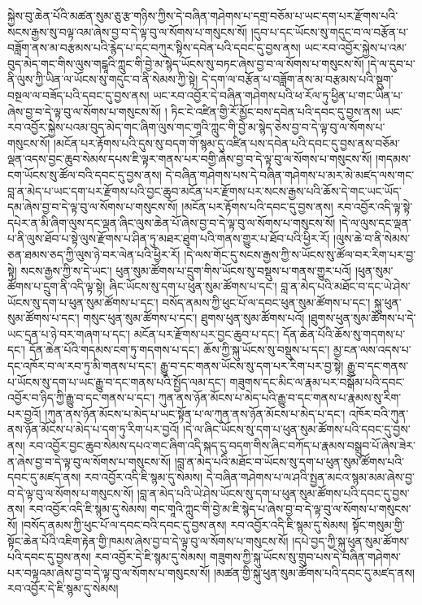 སྐྱེས་བུ་ཆེན་པོའི་མཚན་སུམ་ཅུ་རྩ་གཉིས་ཀྱིས་དེ་བཞིན་གཤེགས་པ་དགྲ་བཅོམ་པ་ཡང་དག་པར་རྫོགས་པའི་སངས་རྒྱས་སུ་བལྟ་འམ་ཞེས་བྱ་བ་དེ་ལྟ་བུ་ལ་སོགས་པ་གསུངས་སོ། །དུབ་པ་དང་ཡོངས་སུ་གདུང་བ་ལ་བརྩོན་པ་བཟློག་ནས་མ་བརྩམས་པའི་རྙེད་པ་དང་བཀུར་སྟིས་དབེན་པའི་དབང་དུ་བྱས་ནས། ཡང་རབ་འབྱོར་སྐྱེས་པ་འམ་བུད་མེད་གང་གིས་ལུས་གངྒཱའི་ཀླུང་གི་བྱེ་མ་སྙེད་ཡོངས་སུ་བཏང་ཞེས་བྱ་བ་ལ་སོགས་པ་གསུངས་སོ། །དེ་ལ་དུབ་པ་ནི་ལུས་ཀྱི་ཡིན་ལ་ཡོངས་སུ་གདུང་བ་ནི་སེམས་ཀྱི་སྟེ། དེ་དག་ལ་བརྩོན་པ་བཟློག་ནས་མ་བརྩམས་པའི་སྡུག་བསྔལ་ལ་བཟོད་པའི་དབང་དུ་བྱས་ནས། ཡང་རབ་འབྱོར་དེ་བཞིན་གཤེགས་པའི་ཕ་རོལ་ཏུ་ཕྱིན་པ་གང་ཡིན་པ་ཞེས་བྱ་བ་དེ་ལྟ་བུ་ལ་སོགས་པ་གསུངས་སོ། །
ཏིང་ངེ་འཛིན་གྱི་རོ་མྱོང་བས་དབེན་པའི་དབང་དུ་བྱས་ནས། ཡང་རབ་འབྱོར་སྐྱེས་པའམ་བུད་མེད་གང་ཞིག་ལུས་གང་གཱའི་ཀླུང་གི་བྱེ་མ་སྙེད་ཅེས་བྱ་བ་དེ་ལྟ་བུ་ལ་སོགས་པ་གསུངས་སོ། །མངོན་པར་རྟོགས་པའི་དུས་སུ་བདག་གོ་སྙམ་དུ་འཛིན་པས་དབེན་པའི་དབང་དུ་བྱས་ནས་བཅོམ་ལྡན་འདས་བྱང་ཆུབ་སེམས་དཔས་ཇི་ལྟར་གནས་པར་བགྱི་ཞེས་བྱ་བ་དེ་ལྟ་བུ་ལ་སོགས་པ་གསུངས་སོ། །གདམས་ངག་ཡོངས་སུ་ཚོལ་བའི་དབང་དུ་བྱས་ནས། དེ་བཞིན་གཤེགས་པས་དེ་བཞིན་གཤེགས་པ་མར་མེ་མཛད་ལས་གང་བླ་ན་མེད་པ་ཡང་དག་པར་རྫོགས་པའི་བྱང་ཆུབ་མངོན་པར་རྫོགས་པར་སངས་རྒྱས་པའི་ཆོས་དེ་གང་ཡང་ཡོད་དམ་ཞེས་བྱ་བ་དེ་ལྟ་བུ་ལ་སོགས་པ་གསུངས་སོ། །མངོན་པར་རྟོགས་པའི་དབང་དུ་བྱས་ནས། རབ་འབྱོར་འདི་ལྟ་སྟེ་དཔེར་ན་མི་ཞིག་ལུས་དང་ལྡན་ཞིང་ལུས་ཆེན་པོ་ཞེས་བྱ་བ་དེ་ལྟ་བུ་ལ་སོགས་པ་གསུངས་སོ། །དེ་ལ་ལུས་དང་ལྡན་པ་ནི་ལུས་ཐོབ་པ་སྟེ་ལུས་རྫོགས་པ་ཤིན་ཏུ་མཐར་ཐུག་པའི་གནས་གྱུར་པ་ཐོབ་པའི་ཕྱིར་རོ། །ལུས་ཆེ་བ་ནི་སེམས་ཅན་ཐམས་ཅད་ཀྱི་ལུས་ཉེ་བར་ལེན་པའི་ཕྱིར་རོ། །དེ་ལས་གོང་དུ་སངས་རྒྱས་ཀྱི་ས་ཡོངས་སུ་ཚོལ་བར་རིག་པར་བྱ་སྟེ། སངས་རྒྱས་ཀྱི་ས་དེ་ཡང་། ཕུན་སུམ་ཚོགས་པ་དྲུག་གིས་ཡོངས་སུ་བསྡུས་པ་གནས་གྱུར་པའོ། །ཕུན་སུམ་ཚོགས་པ་དྲུག་ནི་འདི་ལྟ་སྟེ། ཞིང་ཡོངས་སུ་དག་པ་ཕུན་སུམ་ཚོགས་པ་དང་། བླ་ན་མེད་པའི་མཐོང་བ་དང་ཡེ་ཤེས་ཡོངས་སུ་དག་པ་ཕུན་སུམ་ཚོགས་པ་དང་། བསོད་ནམས་ཀྱི་ཕུང་པོ་ལ་དབང་ཕུན་སུམ་ཚོགས་པ་དང་། སྐུ་ཕུན་སུམ་ཚོགས་པ་དང་། གསུང་ཕུན་སུམ་ཚོགས་པ་དང་། ཐུགས་ཕུན་སུམ་ཚོགས་པའོ། །ཐུགས་ཕུན་སུམ་ཚོགས་པ་དེ་ཡང་དྲན་པ་ཉེ་བར་གཞག་པ་དང་། མངོན་པར་རྫོགས་པར་བྱང་ཆུབ་པ་དང་། དོན་ཆེན་པོའི་ཆོས་སུ་གདགས་པ་དང་། དོན་ཆེན་པོའི་གདམས་ངག་ཏུ་གདགས་པ་དང་། ཆོས་ཀྱི་སྐུ་ཡོངས་སུ་བསྡུས་པ་དང་། མྱ་ངན་ལས་འདས་པ་དང་འཁོར་བ་ལ་རབ་ཏུ་མི་གནས་པ་དང་། རྒྱུ་བ་དང་གནས་ཡོངས་སུ་དག་པར་རིག་པར་བྱ་སྟེ། རྒྱུ་བ་དང་གནས་པ་ཡོངས་སུ་དག་པ་ཡང་རྒྱུ་བ་དང་གནས་པའི་སྤྱོད་ལམ་དང་། གཟུགས་དང་མིང་ལ་རྣམ་པར་བསྒོམ་པའི་དབང་འབྱོར་བ་ཉིད་ཀྱི་རྒྱུ་བ་དང་གནས་པ་དང་། ཀུན་ནས་ཉོན་མོངས་པ་མེད་པའི་རྒྱུ་བ་དང་གནས་པ་རྣམས་སུ་རིག་པར་བྱའོ། །ཀུན་ནས་ཉོན་མོངས་པ་མེད་པ་ཡང་སྟོན་པ་ལ་ཀུན་ནས་ཉོན་མོངས་པ་མེད་པ་དང་། འཁོར་བའི་ཀུན་ནས་ཉོན་མོངས་པ་མེད་པ་དག་ཏུ་རིག་པར་བྱའོ། །དེ་ལ་ཞིང་ཡོངས་སུ་དག་པ་ཕུན་སུམ་ཚོགས་པའི་དབང་དུ་བྱས་ནས། རབ་འབྱོར་བྱང་ཆུབ་སེམས་དཔའ་གང་ཞིག་འདི་སྐད་དུ་བདག་གིས་ཞིང་བཀོད་པ་རྣམས་བསྒྲུབ་པོ་ཞེས་ཟེར་ན་ཞེས་བྱ་བ་དེ་ལྟ་བུ་ལ་སོགས་པ་གསུངས་སོ། །བླ་ན་མེད་པའི་མཐོང་བ་ཡོངས་སུ་དག་པ་ཕུན་སུམ་ཚོགས་པའི་དབང་དུ་མཛད་ནས། རབ་འབྱོར་འདི་ཇི་སྙམ་དུ་སེམས། དེ་བཞིན་གཤེགས་པ་ལ་ཤའི་སྤྱན་མངའ་སྙམ་མམ་ཞེས་བྱ་བ་དེ་ལྟ་བུ་ལ་སོགས་པ་གསུངས་སོ། །བླ་ན་མེད་པའི་ཡེ་ཤེས་ཡོངས་སུ་དག་པ་ཕུན་སུམ་ཚོགས་པའི་དབང་དུ་བྱས་ནས། རབ་འབྱོར་འདི་ཇི་སྙམ་དུ་སེམས། གང་གཱའི་ཀླུང་གི་བྱེ་མ་ཇི་སྙེད་པ་ཞེས་བྱ་བ་དེ་ལྟ་བུ་ལ་སོགས་པ་གསུངས་སོ། །བསོད་ནམས་ཀྱི་ཕུང་པོ་ལ་དབང་བའི་དབང་དུ་བྱས་ནས། རབ་འབྱོར་འདི་ཇི་སྙམ་དུ་སེམས། སྟོང་གསུམ་གྱི་སྟོང་ཆེན་པོའི་འཇིག་རྟེན་གྱི་ཁམས་ཞེས་བྱ་བ་དེ་ལྟ་བུ་ལ་སོགས་པ་གསུངས་སོ། །དཔེ་བྱད་ཀྱི་སྐུ་ཕུན་སུམ་ཚོགས་པའི་དབང་དུ་བྱས་ནས། རབ་འབྱོར་དེ་ཇི་སྙམ་དུ་སེམས། གཟུགས་ཀྱི་སྐུ་ཡོངས་སུ་གྲུབ་པས་དེ་བཞིན་གཤེགས་པར་བལྟའམ་ཞེས་བྱ་བ་དེ་ལྟ་བུ་ལ་སོགས་པ་གསུངས་སོ། །མཚན་གྱི་སྐུ་ཕུན་སུམ་ཚོགས་པའི་དབང་དུ་མཛད་ནས། རབ་འབྱོར་དེ་ཇི་སྙམ་དུ་སེམས། 